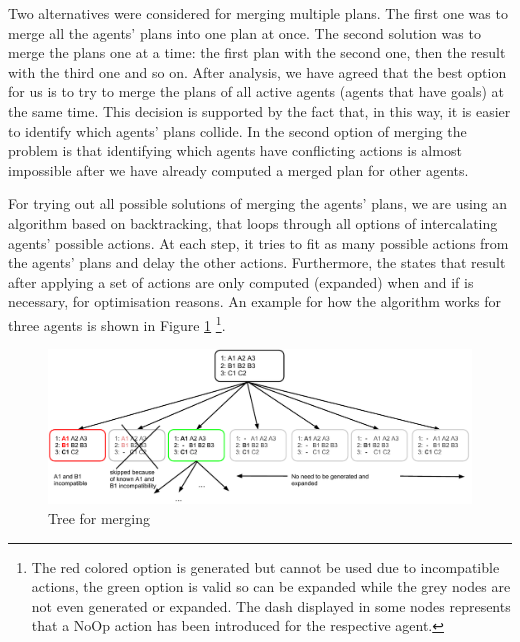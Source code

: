 Two alternatives were considered for merging multiple plans. The first one was to merge all the agents' plans
into one plan at once. The second solution was to merge the plans one at a time: the first plan with the
second one, then the result with the third one and so on. After analysis, we have agreed that the best option
for us is to try to merge the plans of all active agents (agents that have goals) at the same time. This
decision is supported by the fact that, in this way, it is easier to identify which agents’ plans collide. In
the second option of merging the problem is that identifying which agents have conflicting actions is almost
impossible after we have already computed a merged plan for other agents.

For trying out all possible solutions of merging the agents’ plans, we are using an algorithm based on
backtracking, that loops through all options of intercalating agents’ possible actions. At each step, it tries
to fit as many possible actions from the agents’ plans and delay the other actions. Furthermore, the states
that result after applying a set of actions are only computed (expanded) when and if is necessary, for
optimisation reasons.  An example for how the algorithm works for three agents is shown in Figure
\ref{fig:plan_merging} \footnote{The red colored option is generated but cannot be used due to incompatible
actions, the green option is valid so can be expanded while the grey nodes are not even generated or expanded.
The dash displayed in some nodes represents that a NoOp action has been introduced for the respective agent.}.

\begin{figure}[htb]
\begin{center}
 \includegraphics[width=\textwidth]{figures/plan_merging.pdf}
 \caption{Tree for merging}
 \label{fig:plan_merging}
\end{center}
\end{figure}

